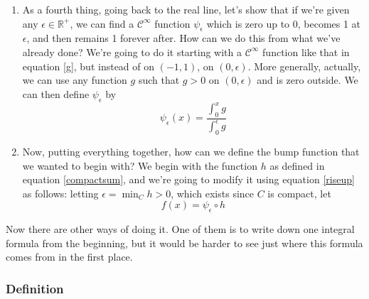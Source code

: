\documentclass{article}
\newcommand{\reals}[0]{\mathbb{R}}
\newcommand{\mc}[1]{\mathcal{#1}}
\begin{document}
\begin{enumerate}
  \item As a fourth thing, going back to the real line, let's show that if we're given any \(\epsilon \in \reals^+\), we can find a \(\mc{C}^\infty\) function \(\psi_\epsilon\) which is zero up to 0, becomes 1 at \(\epsilon\), and then remains 1 forever after. How can we do this from what we've already done? We're going to do it starting with a \(\mc{C}^\infty\) function like that in equation \ref{g}, but instead of on \((-1, 1)\), on \((0, \epsilon)\). More generally, actually, we can use any function \(g\) such that \(g > 0\) on \((0, \epsilon)\) and is zero outside. We can then define \(\psi_\epsilon\) by
  \begin{equation}
    \psi_\epsilon(x) = \frac{\int_0^xg}{\int_0^\epsilon g}
    \label{riseup}
  \end{equation}

  \item Now, putting everything together, how can we define the bump function that we wanted to begin with? We begin with the function \(h\) as defined in equation \ref{compactsum}, and we're going to modify it using equation \ref{riseup} as follows: letting \(\epsilon = \min_Ch > 0\), which exists since \(C\) is compact, let
  \begin{equation}
    f(x) = \psi_\epsilon \circ h
  \end{equation}

\end{enumerate}

Now there are other ways of doing it. One of them is to write down one integral formula from the beginning, but it would be harder to see just where this formula comes from in the first place.

\subsubsection{Definition}
\end{document}
